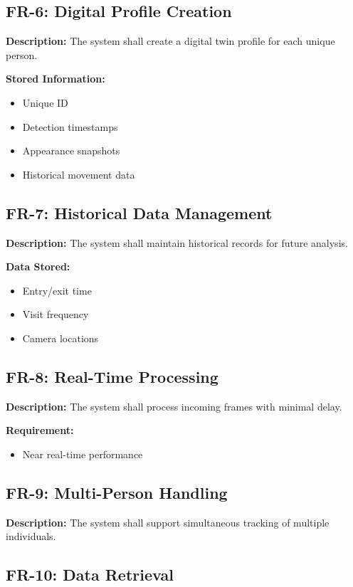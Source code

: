 \documentclass[12pt,a4paper]{article}
\begin{document}
\subsection{FR-6: Digital Profile Creation}

\textbf{Description:}
The system shall create a digital twin profile for each unique person.

\textbf{Stored Information:}
\begin{itemize}
    \item Unique ID
    \item Detection timestamps
    \item Appearance snapshots
    \item Historical movement data
\end{itemize}

\subsection{FR-7: Historical Data Management}

\textbf{Description:}
The system shall maintain historical records for future analysis.

\textbf{Data Stored:}
\begin{itemize}
    \item Entry/exit time
    \item Visit frequency
    \item Camera locations
\end{itemize}

\subsection{FR-8: Real-Time Processing}

\textbf{Description:}
The system shall process incoming frames with minimal delay.

\textbf{Requirement:}
\begin{itemize}
    \item Near real-time performance
\end{itemize}

\subsection{FR-9: Multi-Person Handling}

\textbf{Description:}
The system shall support simultaneous tracking of multiple individuals.

\subsection{FR-10: Data Retrieval}
\end{document}
